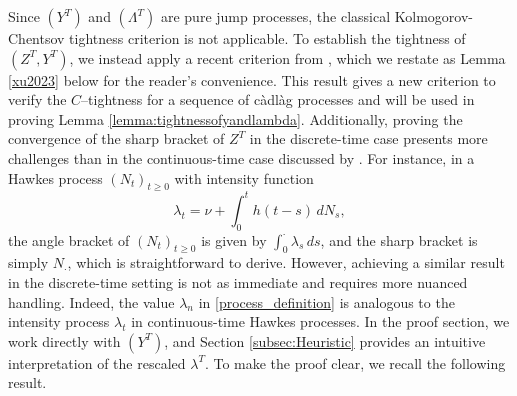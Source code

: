 \documentclass[letterpaper]{article}
\numberwithin{equation}{section}
\theoremstyle{definition}
\theoremstyle{remark}
\begin{document}
Since $(Y^T)$ and $(\Lambda^T)$ are pure jump processes, the classical Kolmogorov-Chentsov tightness criterion is not applicable. To establish the tightness of $(Z^{T},Y^{T})$, we instead apply a recent criterion from \cite{horst2023convergence}, which we restate as Lemma \ref{xu2023} below for the reader's convenience. This result gives a new criterion to verify the $C$--tightness for a sequence of c\`adl\`ag processes and will be used in proving Lemma \ref{lemma:tightnessofyandlambda}. Additionally, proving the convergence of the sharp bracket of $Z^T$ in the discrete-time case presents more challenges than in the continuous-time case discussed by \cite{jaisson2016rough}. For instance, in a Hawkes process $(N_t)_{t \ge 0}$ with {intensity function}
\[
  \lambda_t = \nu + \int_0^t h(t-s) \, dN_s,
\]
the angle bracket of $(N_t)_{t \ge 0}$ is given by $\int_0^\cdot \lambda_s \, ds$, and the sharp bracket is simply $N_\cdot$, which is straightforward to derive. However, achieving a similar result in the discrete-time setting is not as immediate and requires more nuanced handling. Indeed, the value $\lambda_n$ in \eqref{process_definition} is analogous to the intensity process $\lambda_t$ in continuous-time Hawkes processes. In the proof section, we work directly with $(Y^T)$, {and Section}
\ref{subsec:Heuristic} provides an intuitive interpretation of the rescaled $\lambda^T$. {To make the proof clear, we recall the following result.}
\end{document}
